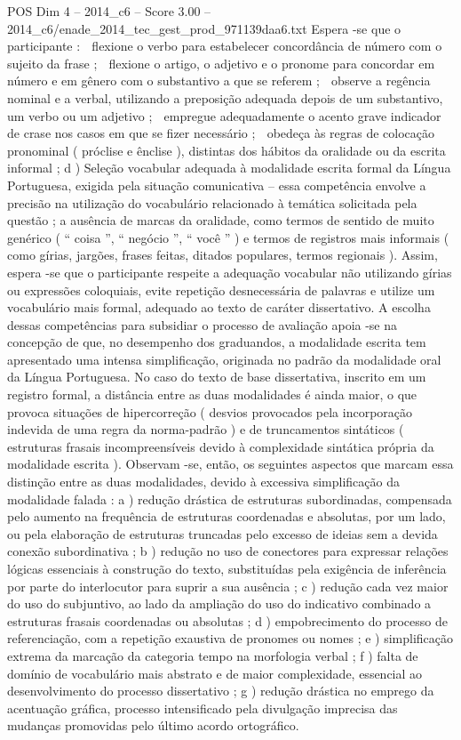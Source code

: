 \begin{textsample}{POS Dim 4 – 2014\_c6 – Score 3.00 – 2014\_c6/enade\_2014\_tec\_gest\_prod\_971139daa6.txt}
Espera -se que o participante :  flexione o verbo para estabelecer concordância de número com o sujeito da frase ;  flexione o artigo, o adjetivo e o pronome para concordar em número e em gênero com o substantivo a que se referem ;  observe a regência nominal e a verbal, utilizando a preposição adequada depois de um substantivo, um verbo ou um adjetivo ;  empregue adequadamente o acento grave indicador de crase nos casos em que se fizer necessário ;  obedeça às regras de colocação pronominal ( próclise e ênclise ), distintas dos hábitos da oralidade ou da escrita informal ; d ) Seleção vocabular adequada à modalidade escrita formal da Língua Portuguesa, exigida pela situação comunicativa – essa competência envolve a precisão na utilização do vocabulário relacionado à temática solicitada pela questão ; a ausência de marcas da oralidade, como termos de sentido de muito genérico ( “ coisa ”, “ negócio ”, “ você ” ) e termos de registros mais informais ( como gírias, jargões, frases feitas, ditados populares, termos regionais ).
Assim, espera -se que o participante respeite a adequação vocabular não utilizando gírias ou expressões coloquiais, evite repetição desnecessária de palavras e utilize um vocabulário mais formal, adequado ao texto de caráter dissertativo.
A escolha dessas competências para subsidiar o processo de avaliação apoia -se na concepção de que, no desempenho dos graduandos, a modalidade escrita tem apresentado uma intensa simplificação, originada no padrão da modalidade oral da Língua Portuguesa.
No caso do texto de base dissertativa, inscrito em um registro formal, a distância entre as duas modalidades é ainda maior, o que provoca situações de hipercorreção ( desvios provocados pela incorporação indevida de uma regra da norma-padrão ) e de truncamentos sintáticos ( estruturas frasais incompreensíveis devido à complexidade sintática própria da modalidade escrita ).
Observam -se, então, os seguintes aspectos que marcam essa distinção entre as duas modalidades, devido à excessiva simplificação da modalidade falada : a ) redução drástica de estruturas subordinadas, compensada pelo aumento na frequência de estruturas coordenadas e absolutas, por um lado, ou pela elaboração de estruturas truncadas pelo excesso de ideias sem a devida conexão subordinativa ; b ) redução no uso de conectores para expressar relações lógicas essenciais à construção do texto, substituídas pela exigência de inferência por parte do interlocutor para suprir a sua ausência ; c ) redução cada vez maior do uso do subjuntivo, ao lado da ampliação do uso do indicativo combinado a estruturas frasais coordenadas ou absolutas ; d ) empobrecimento do processo de referenciação, com a repetição exaustiva de pronomes ou nomes ; e ) simplificação extrema da marcação da categoria tempo na morfologia verbal ; f ) falta de domínio de vocabulário mais abstrato e de maior complexidade, essencial ao desenvolvimento do processo dissertativo ; g ) redução drástica no emprego da acentuação gráfica, processo intensificado pela divulgação imprecisa das mudanças promovidas pelo último acordo ortográfico.

\end{textsample}
